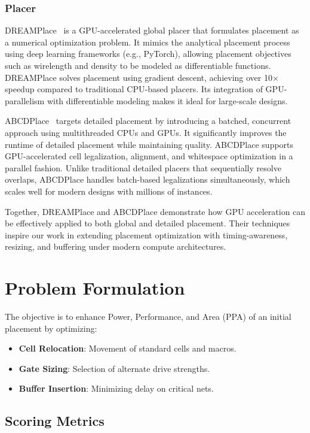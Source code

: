 \documentclass[conference]{IEEEtran}
\begin{document}
\subsubsection{Placer}
DREAMPlace~\cite{DREAMplace} is a GPU-accelerated global placer that formulates placement as a numerical optimization problem. It mimics the analytical placement process using deep learning frameworks (e.g., PyTorch), allowing placement objectives such as wirelength and density to be modeled as differentiable functions. DREAMPlace solves placement using gradient descent, achieving over 10× speedup compared to traditional CPU-based placers. Its integration of GPU-parallelism with differentiable modeling makes it ideal for large-scale designs.

ABCDPlace~\cite{ABCDPlace} targets detailed placement by introducing a batched, concurrent approach using multithreaded CPUs and GPUs. It significantly improves the runtime of detailed placement while maintaining quality. ABCDPlace supports GPU-accelerated cell legalization, alignment, and whitespace optimization in a parallel fashion. Unlike traditional detailed placers that sequentially resolve overlaps, ABCDPlace handles batch-based legalizations simultaneously, which scales well for modern designs with millions of instances.

Together, DREAMPlace and ABCDPlace demonstrate how GPU acceleration can be effectively applied to both global and detailed placement. Their techniques inspire our work in extending placement optimization with timing-awareness, resizing, and buffering under modern compute architectures.



\section{Problem Formulation}

The objective is to enhance Power, Performance, and Area (PPA) of an initial placement by optimizing:
\begin{itemize}
    \item \textbf{Cell Relocation}: Movement of standard cells and macros.
    \item \textbf{Gate Sizing}: Selection of alternate drive strengths.
    \item \textbf{Buffer Insertion}: Minimizing delay on critical nets.
\end{itemize}

\subsection{Scoring Metrics}
\end{document}
